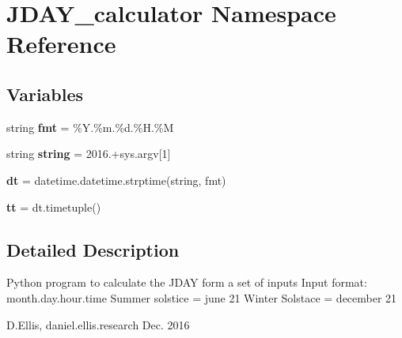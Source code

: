 \hypertarget{namespaceJDAY__calculator}{}\section{J\+D\+A\+Y\+\_\+calculator Namespace Reference}
\label{namespaceJDAY__calculator}
\subsection*{Variables}
\begin{DoxyCompactItemize}
\item 
\mbox{\label{namespaceJDAY__calculator_aba48077ea8b46a19e5a8ac3536b90ef8}} 
string {\bfseries fmt} = \textquotesingle{}\%Y.\%m.\%d.\%H.\%M\textquotesingle{}
\item 
\mbox{\label{namespaceJDAY__calculator_a40cf16565eee549565c36cdc069c0b4f}} 
string {\bfseries string} = \textquotesingle{}2016.\textquotesingle{}+sys.\+argv\mbox{[}1\mbox{]}
\item 
\mbox{\label{namespaceJDAY__calculator_ab2c1a06b9e6e6d6a74ef02757b79e4f1}} 
{\bfseries dt} = datetime.\+datetime.\+strptime(string, fmt)
\item 
\mbox{\label{namespaceJDAY__calculator_ab958442ea7316fd8a610c23aa74716a0}} 
{\bfseries tt} = dt.\+timetuple()
\end{DoxyCompactItemize}


\subsection{Detailed Description}
\begin{DoxyVerb}Python program to calculate the JDAY form a set of inputs
Input format: month.day.hour.time
Summer solstice = june 21
Winter Solstace = december 21

D.Ellis, daniel.ellis.research Dec. 2016
\end{DoxyVerb}
 